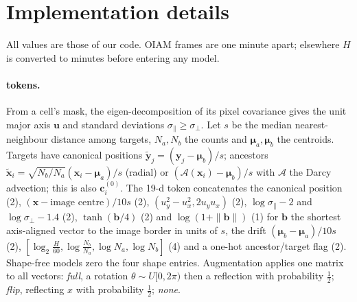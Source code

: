 \section{Implementation details}
\label{sec:supp-impl}
All values are those of our code. OIAM frames are one minute apart; elsewhere $H$ is converted to minutes before entering any model.

\paragraph{\ours tokens.}
From a cell's mask, the eigen-decomposition of its pixel covariance gives the unit major axis $\mathbf{u}$ and standard deviations $\sigma_\parallel\ge\sigma_\perp$.
Let $s$ be the median nearest-neighbour distance among targets, $N_a,N_b$ the counts and $\boldsymbol\mu_a,\boldsymbol\mu_b$ the centroids.
Targets have canonical positions $\tilde{\mathbf{y}}_j=(\mathbf{y}_j-\boldsymbol\mu_b)/s$; ancestors $\tilde{\mathbf{x}}_i=\sqrt{N_b/N_a}(\mathbf{x}_i-\boldsymbol\mu_a)/s$ (radial) or $(\mathcal{A}(\mathbf{x}_i)-\boldsymbol\mu_b)/s$ with $\mathcal{A}$ the Darcy advection; this is also $\mathbf{c}^{(0)}_i$.
The 19-d token concatenates the canonical position (2), $(\mathbf{x}-\text{image centre})/10s$ (2), $(u_y^2{-}u_x^2,2u_yu_x)$ (2), $\log\sigma_\parallel{-}2$ and $\log\sigma_\perp{-}1.4$ (2), $\tanh(\mathbf{b}/4)$ (2) and $\log(1{+}\|\mathbf{b}\|)$ (1) for $\mathbf{b}$ the shortest axis-aligned vector to the image border in units of $s$, the drift $(\boldsymbol\mu_b{-}\boldsymbol\mu_a)/10s$ (2), $[\log_2\frac{H}{60},\log\frac{N_b}{N_a},\log N_a,\log N_b]$ (4) and a one-hot ancestor/target flag (2).
Shape-free models zero the four shape entries.
Augmentation applies one matrix to all vectors: \emph{full}, a rotation $\theta\sim U[0,2\pi)$ then a reflection with probability $\frac12$; \emph{flip}, reflecting $x$ with probability $\frac12$; \emph{none}.

